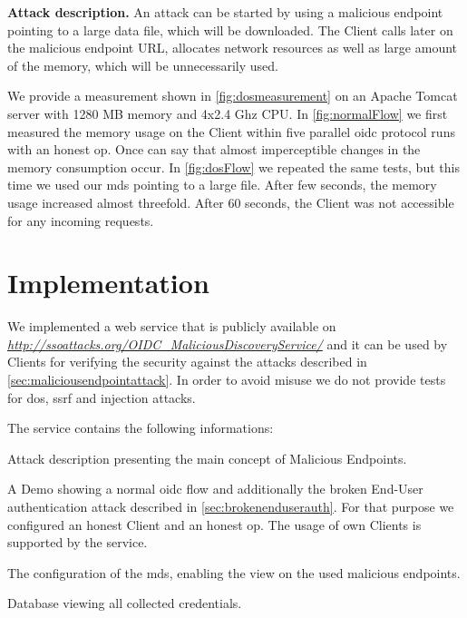 \documentclass[conference,compsoc]{IEEEtran}
\renewcommand*{\paragraph}[1]{\vspace{2mm}\noindent\textbf{#1.}}
\begin{document}
\paragraph{Attack description}
An attack can be started by using a malicious endpoint pointing to a large data file, which will be downloaded.
The Client calls later on the malicious endpoint URL, allocates network resources as well as large amount of the memory, which will be unnecessarily used.


We provide a measurement shown in \autoref{fig:dosmeasurement} on an Apache Tomcat server with 1280 MB memory and 4x2.4 Ghz CPU.
In \autoref{fig:normalFlow} we first measured the memory usage on the Client within five parallel \gls{oidc} protocol runs with an honest \gls{op}. Once can say that almost imperceptible changes in the memory consumption occur.
In \autoref{fig:dosFlow} we repeated the same tests, but this time we used our \gls{mds} pointing to a large file. After few seconds, the memory usage increased almost threefold.  After 60 seconds, the Client was not accessible for any incoming requests.
 \section{Implementation}
\label{sec:demo}

We implemented a web service that is publicly available on \emph{\url{http://ssoattacks.org/OIDC_MaliciousDiscoveryService/}} and it can be used by Clients for verifying the security against the attacks described in \autoref{sec:maliciousendpointattack}. In order to avoid misuse we do not provide tests for \gls{dos}, \gls{ssrf} and injection attacks.

The service contains the following informations:
\begin{inparaenum}
 \item Attack description presenting the main concept of Malicious Endpoints.
 \item A Demo showing a normal \gls{oidc} flow and additionally the broken End-User authentication attack described in \autoref{sec:brokenenduserauth}. For that purpose we configured an honest Client and an honest \gls{op}. The usage of own Clients is supported by the service.
 \item The configuration of the \gls{mds}, enabling the view on the used malicious endpoints.
 \item Database viewing all collected credentials.
\end{inparaenum}
\end{document}
